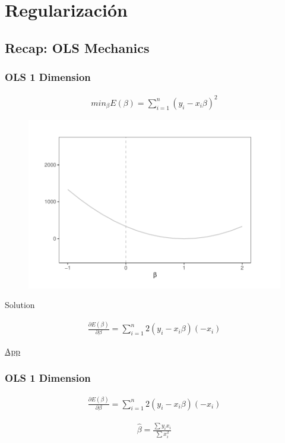 \documentclass[
  shownotes,
  xcolor={svgnames},
  hyperref={colorlinks,citecolor=DarkBlue,linkcolor=andesred,urlcolor=DarkBlue}
  , aspectratio=169]{beamer}
\begin{document}
\section{Regularización}
\subsection{Recap: OLS Mechanics}
\begin{frame}[fragile]
\frametitle{OLS 1 Dimension}
\footnotesize
\begin{align}
 min_{\beta} E(\beta)=\sum_{i=1}^n (y_i-x_i \beta)^2 
\end{align}
   \begin{figure}[H] \centering
            \captionsetup{justification=centering}
              \includegraphics[scale=0.4]{figures/lasso0.pdf}
 \end{figure}

Solution

\begin{align}
\frac{\partial E(\beta)}{\partial \beta}= \sum_{i=1}^n 2(y_i-x_i \beta)(-x_i )
\end{align}

\href{https://cede.uniandes.edu.co/OLS/}{App}

\end{frame}
\begin{frame}[fragile]
\frametitle{OLS 1 Dimension}
\begin{align}
\frac{\partial E(\beta)}{\partial \beta}= \sum_{i=1}^n 2(y_i-x_i \beta)(-x_i )
\end{align}

\begin{align}
\hat{\beta} = \frac{\sum y_ix_i}{\sum x^2_i}
\end{align}
\end{frame}
\end{document}
